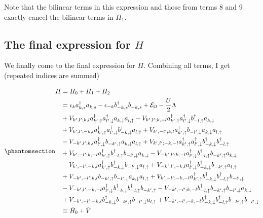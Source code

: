 \documentclass[
  letterpaper,
  DIV=11,
  numbers=noendperiod]{scrartcl}
\begin{document}
Note that the bilinear terms in this expression and those from terms 8
and 9 exactly cancel the bilinear terms in \(H_1\).

\subsection{\texorpdfstring{The final expression for
\(H\)}{The final expression for H}}\label{the-final-expression-for-h}

We finally come to the final expression for \(H\). Combining all terms,
I get (repeated indices are summed)

\begin{equation}\protect\phantomsection\label{eq-tildeV}{
\begin{align}
H&=H_0+H_1+H_2\\
&=\epsilon_{k}a^{\dagger}_{k,s}a^{}_{k,s}-\epsilon_{-k}b^{\dagger}_{-k,s}b^{}_{-k,s}+\mathcal{E}_{\Omega}-\frac{U}{2}\Lambda\\
%
&+V_{k',l';k,l}a^\dagger_{k',\uparrow}a^\dagger_{l',\downarrow}a^{}_{k,\downarrow}a^{}_{l,\uparrow}-V_{k',l';k,-l}a^\dagger_{k',\uparrow}a^\dagger_{l',\downarrow}b^\dagger_{-l,\uparrow}a^{}_{k,\downarrow}\\
&+V_{k',l';-k,l}a^\dagger_{k',\uparrow}a^\dagger_{l',\downarrow}b^\dagger_{-k,\downarrow}a^{}_{l,\uparrow}+V_{k',-l';k,l}a^\dagger_{k',\uparrow}b^{}_{-l',\downarrow}a^{}_{k,\downarrow}a^{}_{l,\uparrow}\\
&-V_{-k',l';k,l}a^\dagger_{l',\downarrow}b^{}_{-k',\uparrow}a^{}_{k,\downarrow}a^{}_{l,\uparrow}+V_{k',l';-k,-l}a^\dagger_{k',\uparrow}a^\dagger_{l',\downarrow}b^\dagger_{-k,\downarrow}b^\dagger_{-l,\uparrow}\\
&+V_{k',-l';k,-l}a^\dagger_{k',\uparrow}b^\dagger_{-l,\uparrow}b^{}_{-l',\downarrow}a^{}_{k,\downarrow}-V_{-k',l';k,-l}a^\dagger_{l',\downarrow}b^\dagger_{-l,\uparrow}b^{}_{-k',\uparrow}a^{}_{k,\downarrow}\\
%
&-V_{k',-l';-k,l}a^\dagger_{k',\uparrow}b^\dagger_{-k,\downarrow}b^{}_{-l',\downarrow}a^{}_{l,\uparrow}+V_{-k',l';-k,l}a^\dagger_{l',\downarrow}b^\dagger_{-k,\downarrow}b^{}_{-k',\uparrow}a^{}_{l,\uparrow}\\
&+V_{-k',-l';k,l}b^{}_{-k',\uparrow}b^{}_{-l',\downarrow}a^{}_{k,\downarrow}a^{}_{l,\uparrow}+V_{k',-l';-k,-l}a^\dagger_{k',\uparrow}b^\dagger_{-k,\downarrow}b^\dagger_{-l,\uparrow}b^{}_{-l',\downarrow}\\
&-V_{-k',l';-k,-l}a^\dagger_{l',\downarrow}b^\dagger_{-k,\downarrow}b^\dagger_{-l,\uparrow}b^{}_{-k',\uparrow}-V_{-k',-l';k,-l}b^\dagger_{-l,\uparrow}b^{}_{-k',\uparrow}b^{}_{-l',\downarrow}a^{}_{k,\downarrow}\\
&+V_{-k',-l';-k,l}b^\dagger_{-k,\downarrow}b^{}_{-k',\uparrow}b^{}_{-l',\downarrow}a^{}_{l,\uparrow}+V_{-k',-l';-k,-l}b^\dagger_{-k,\downarrow}b^\dagger_{-l,\uparrow}b^{}_{-k',\uparrow}b^{}_{-l',\downarrow}\\
&\equiv \tilde H_0+\tilde V
\end{align}
}\end{equation}
\end{document}
